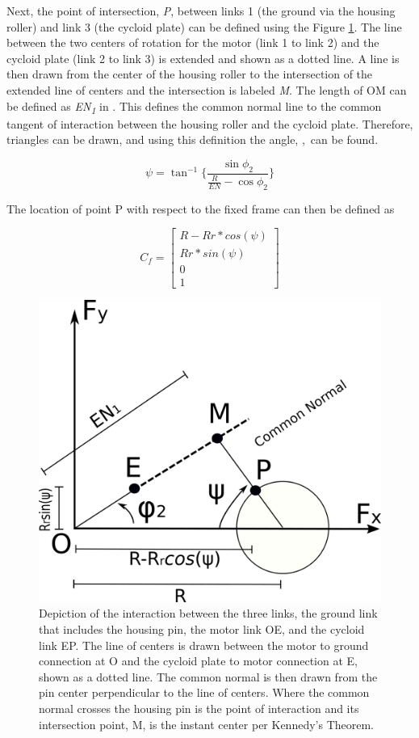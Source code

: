 Next, the point of intersection, \textit{P}, between links 1 (the ground via the housing roller) and link 3 (the cycloid plate) can be defined using the Figure \ref{fig:single_angles}. The line between the two centers of rotation for the motor (link 1 to link 2) and the cycloid plate (link 2 to link 3) is extended and shown as a dotted line. A line is then drawn from the center of the housing roller to the intersection of the extended line of centers and the intersection is labeled \textit{M}. The length of OM can be defined as \textit{EN\textsubscript{1}} in \cite{ref:on_the_lobe}. This defines the common normal line to the common tangent of interaction between the housing roller and the cycloid plate. Therefore, triangles can be drawn, and using this definition the angle, \textpsi,\ can be found. 

\begin{equation} \label{eq:psi}
\psi = \tan^{-1}{\bigg\{\frac{\sin\phi_2}{\frac{R}{EN} - \cos{\phi_2}}\bigg\}}
\end{equation}

The location of point P with respect to the fixed frame can then be defined as 

\begin{equation} \label{eq:Cf}
C_f = \left[\begin{array}{c}
		R-Rr*cos(\psi)\\
		Rr*sin(\psi)\\
		0\\
		1
		\end{array} \right]
\end{equation}


\begin{figure}[t]
   \centering
   \includegraphics[width=0.60\linewidth]{fig/single_stage_angles}
   \caption{Depiction of the interaction between the three links, the ground link that includes the housing pin, the motor link OE, and the cycloid link EP. The line of centers is drawn between the motor to ground connection at O and the cycloid plate to motor connection at E, shown as a dotted line. The common normal is then drawn from the pin center perpendicular to the line of centers. Where the common normal crosses the housing pin is the point of interaction and its intersection point, M, is the instant center per Kennedy's Theorem.}
   \label{fig:single_angles}
\end{figure}

